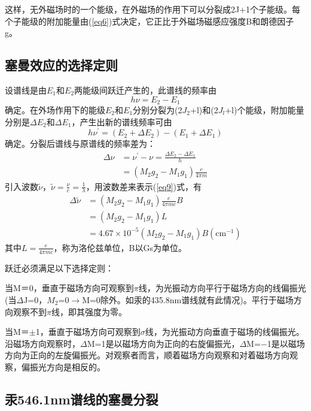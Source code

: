 \documentclass{buaaemp}
\begin{document}
这样，无外磁场时的一个能级，在外磁场的作用下可以分裂成2J+1个子能级。每个子能级的附加能量由(\ref{eq6})式决定，它正比于外磁场磁感应强度B和朗德因子g。

\subsection{塞曼效应的选择定则}
设谱线是由$E_1$和$E_2$两能级间跃迁产生的，此谱线的频率由
\begin{equation} 
h\nu = E_2 - E_1\label{eq7}
\end{equation}
确定。在外场作用下的能级$E_2$和$E_1$分别分裂为(2$J_2$+l)和(2$J_l$+l)个能级，附加能量分别是$\Delta E_2$和$\Delta E_1$，产生出新的谱线频率可由
\begin{equation}
h\nu^{'} = (E_2+\Delta E_2) - (E_1+\Delta E_1)\label{eq8}
\end{equation}
确定。分裂后谱线与原谱线的频率差为：
\begin{equation}
\begin{split}
\Delta\nu &= \nu^{'} - \nu = \frac{\Delta E_2 - \Delta E_1}{h}\\
&= (M_2g_2 - M_1g_1)\frac{e}{4\pi m}\label{eq9}
\end{split}
\end{equation}
引入波数$\tilde{\nu}$，$\tilde{\nu} = \frac{\nu}{c} = \frac{1}{\lambda}$，用波数差来表示(\ref{eq9})式，有
\begin{equation}
\begin{split}
\Delta\tilde{\nu} &= (M_2g_2 - M_1g_1)\frac{e}{4\pi mc}B\\
&= (M_2g_2 - M_1g_1)L\\
&= 4.67\times 10^{-5}(M_2g_2 - M_1g_1)B(\text{cm}^{-1})\label{eq10}
\end{split}
\end{equation}
其中$L = \frac{e}{4\pi mc}$，称为洛伦兹单位，B以Gs为单位。

跃迁必须满足以下选择定则：

当M＝0，垂直于磁场方向可观察到$\pi$线，为光振动方向平行于磁场方向的线偏振光(当$\Delta$J=0，$M_2$=0$\to$M=0除外。如汞的435.8nm谱线就有此情况)。平行于磁场方向观察不到$\pi$线，即其强度为零。

当M＝$\pm$1，垂直于磁场方向可观察到$\sigma$线，为光振动方向垂直于磁场的线偏振光。沿磁场方向观察时，$\Delta$M=1是以磁场方向为正向的右旋偏振光，$\Delta$M=$-$1是以磁场方向为正向的左旋偏振光。对观察者而言，顺着磁场方向观察和对着磁场方向观察，偏振光方向是相反的。


\subsection{汞546.1nm谱线的塞曼分裂}
\end{document}
